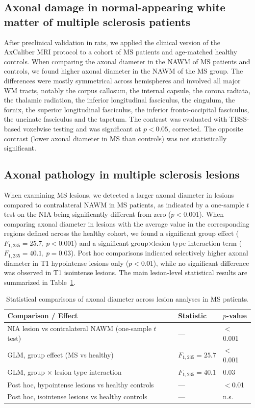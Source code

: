 \documentclass[11pt]{article}
\begin{document}
\subsection{Axonal damage in normal-appearing white matter of multiple sclerosis patients}
After preclinical validation in rats, we applied the clinical version of the AxCaliber MRI protocol to a cohort of MS patients and age-matched healthy controls. When comparing the axonal diameter in the NAWM of MS patients and controls, we found higher axonal diameter in the NAWM of the MS group. The differences were mostly symmetrical across hemispheres and involved all major WM tracts, notably the corpus callosum, the internal capsule, the corona radiata, the thalamic radiation, the inferior longitudinal fasciculus, the cingulum, the fornix, the superior longitudinal fasciculus, the inferior fronto-occipital fasciculus, the uncinate fasciculus and the tapetum. The contrast was evaluated with TBSS-based voxelwise testing and was significant at $p<0.05$, corrected. The opposite contrast (lower axonal diameter in MS than controls) was not statistically significant.

\subsection{Axonal pathology in multiple sclerosis lesions}
When examining MS lesions, we detected a larger axonal diameter in lesions compared to contralateral NAWM in MS patients, as indicated by a one-sample $t$ test on the NIA being significantly different from zero ($p<0.001$). When comparing axonal diameter in lesions with the average value in the corresponding regions defined across the healthy cohort, we found a significant group effect ($F_{1,235}=25.7$, $p<0.001$) and a significant group$\times$lesion type interaction term ($F_{1,235}=40.1$, $p=0.03$). Post hoc comparisons indicated selectively higher axonal diameter in T1 hypointense lesions only ($p<0.01$), while no significant difference was observed in T1 isointense lesions. The main lesion-level statistical results are summarized in Table~\ref{tab:lesions}.

\begin{table}[h]
\centering
\caption{Statistical comparisons of axonal diameter across lesion analyses in MS patients.}
\label{tab:lesions}
\begin{tabular}{lll}
\toprule
Comparison / Effect & Statistic & $p$-value \\
\midrule
NIA lesion vs contralateral NAWM (one-sample $t$ test)            & --- & $<$0.001 \\
GLM, group effect (MS vs healthy)                                  & $F_{1,235}=25.7$    & $<$0.001 \\
GLM, group $\times$ lesion type interaction                        & $F_{1,235}=40.1$    & 0.03 \\
Post hoc, hypointense lesions vs healthy controls                  & --- & $<$0.01 \\
Post hoc, isointense lesions vs healthy controls                   & --- & n.s. \\
\bottomrule
\end{tabular}
\end{table}
\end{document}
